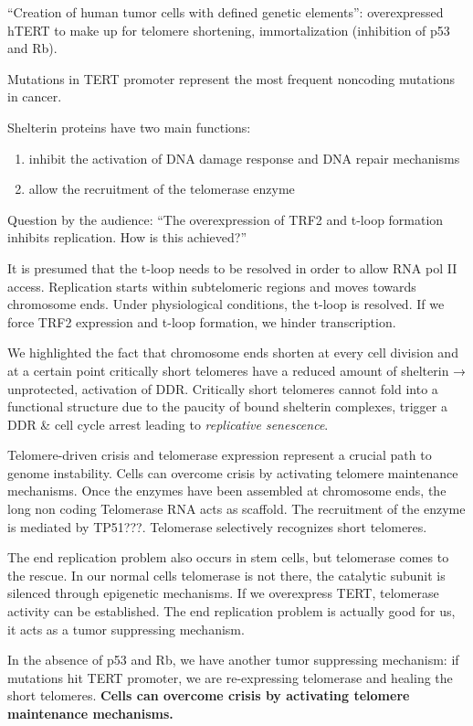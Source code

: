 ``Creation of human tumor cells with defined genetic elements'':
overexpressed hTERT to make up for telomere shortening, immortalization
(inhibition of p53 and Rb).

Mutations in TERT promoter represent the most frequent noncoding
mutations in cancer.


Shelterin proteins have two main functions:

\begin{enumerate}
\def\labelenumi{\arabic{enumi}.}
\tightlist
\item
  inhibit the activation of DNA damage response and DNA repair
  mechanisms
\item
  allow the recruitment of the telomerase enzyme
\end{enumerate}

Question by the audience: ``The overexpression of TRF2 and t-loop
formation inhibits replication. How is this achieved?''

It is presumed that the t-loop needs to be resolved in order to allow
RNA pol II access. Replication starts within subtelomeric regions and
moves towards chromosome ends. Under physiological conditions, the
t-loop is resolved. If we force TRF2 expression and t-loop formation, we
hinder transcription.

We highlighted the fact that chromosome ends shorten at every cell
division and at a certain point critically short telomeres have a
reduced amount of shelterin → unprotected, activation of DDR. Critically
short telomeres cannot fold into a functional structure due to the
paucity of bound shelterin complexes, trigger a DDR \& cell cycle arrest
leading to \emph{replicative senescence}.

Telomere-driven crisis and telomerase expression represent a crucial
path to genome instability. Cells can overcome crisis by activating
telomere maintenance mechanisms. Once the enzymes have been assembled at
chromosome ends, the long non coding Telomerase RNA acts as scaffold.
The recruitment of the enzyme is mediated by TP51???. Telomerase
selectively recognizes short telomeres.

The end replication problem also occurs in stem cells, but telomerase
comes to the rescue. In our normal cells telomerase is not there, the
catalytic subunit is silenced through epigenetic mechanisms. If we
overexpress TERT, telomerase activity can be established. The end
replication problem is actually good for us, it acts as a tumor
suppressing mechanism.

In the absence of p53 and Rb, we have another tumor suppressing
mechanism: if mutations hit TERT promoter, we are re-expressing
telomerase and healing the short telomeres. \textbf{Cells can overcome
crisis by activating telomere maintenance mechanisms.}

